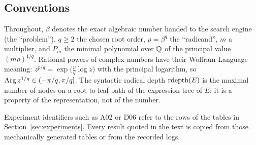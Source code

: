 \subsection{Conventions}
Throughout, $\beta$ denotes the exact algebraic number handed to the search
engine (the ``problem''), $q\ge2$ the chosen root order, $\rho=\beta^q$ the
``radicand'', $m$ a multiplier, and $P_m$ the minimal polynomial over $\mathbb{Q}$ of
the principal value $(m\rho)^{1/q}$. Rational powers of complex numbers have
their Wolfram Language meaning: $z^{p/q}=\exp\!\big(\tfrac pq\log z\big)$ with the
principal logarithm, so $\operatorname{Arg} z^{1/q}\in(-\pi/q,\pi/q]$. The syntactic radical
depth $\operatorname{rdepth}(E)$ is the maximal number of  nodes on
a root-to-leaf path of the expression tree of $E$; it is a property of the
representation, not of the number.

Experiment identifiers such as A02 or D06 refer to the rows of the tables in
Section~\ref{sec:experiments}. Every result quoted in the text is copied from
those mechanically generated tables or from the recorded logs.
